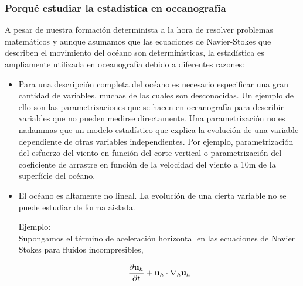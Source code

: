\documentclass[
]{agujournal2019}
\begin{document}
\hypertarget{porquuxe9-estudiar-la-estaduxedstica-en-oceanografuxeda}{%
\subsubsection{Porqué estudiar la estadística en
oceanografía}\label{porquuxe9-estudiar-la-estaduxedstica-en-oceanografuxeda}}

A pesar de nuestra formación determinista a la hora de resolver
problemas matemáticos y aunque asumamos que las ecuaciones de
Navier-Stokes que describen el movimiento del océano son
determinísticas, la estadística es ampliamente utilizada en oceanografía
debido a diferentes razones:

\begin{itemize}
\item {Para una descripción completa del océano es necesario especificar
una gran cantidad de variables, muchas de las cuales son desconocidas. 
Un ejemplo de ello son las parametrizaciones que se hacen en oceanografía para describir variables que no pueden medirse directamente. Una parametrización no es nadammas que un modelo estadístico que explica la evolución de una variable dependiente de otras variables independientes. Por ejemplo, parametrización del esfuerzo del viento en función del corte vertical o parametrización del coeficiente de arrastre en función de la velocidad del viento a 10m de la superfície del océano.}

\item {El océano es altamente no lineal. La evolución de
una cierta variable no se puede estudiar de forma aislada.}

\vspace{0.5cm}

Ejemplo:
\\
Supongamos el término de aceleración horizontal en las ecuaciones de Navier Stokes
para fluidos incompresibles,

\begin{equation}
\frac{\partial{{\textbf u}_h}}{\partial{t}} + 
{\textbf u}_h \cdot {\nabla}_h \textbf {u}_h
\end{equation}


\end{itemize}
\end{document}
